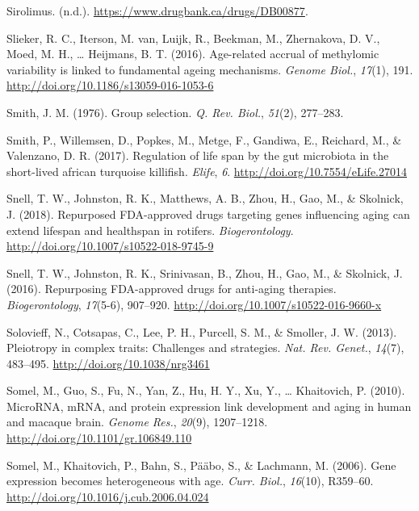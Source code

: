 \documentclass[12pt,twoside]{unicam}
\begin{document}
\begin{cslreferences}
\leavevmode\hypertarget{ref-Sirolimus}{}%
Sirolimus. (n.d.). \url{https://www.drugbank.ca/drugs/DB00877}.

\leavevmode\hypertarget{ref-Slieker2016}{}%
Slieker, R. C., Iterson, M. van, Luijk, R., Beekman, M., Zhernakova, D. V., Moed, M. H., \ldots{} Heijmans, B. T. (2016). Age-related accrual of methylomic variability is linked to fundamental ageing mechanisms. \emph{Genome Biol.}, \emph{17}(1), 191. \url{http://doi.org/10.1186/s13059-016-1053-6}

\leavevmode\hypertarget{ref-Smith1976}{}%
Smith, J. M. (1976). Group selection. \emph{Q. Rev. Biol.}, \emph{51}(2), 277--283.

\leavevmode\hypertarget{ref-Smith2017}{}%
Smith, P., Willemsen, D., Popkes, M., Metge, F., Gandiwa, E., Reichard, M., \& Valenzano, D. R. (2017). Regulation of life span by the gut microbiota in the short-lived african turquoise killifish. \emph{Elife}, \emph{6}. \url{http://doi.org/10.7554/eLife.27014}

\leavevmode\hypertarget{ref-Snell2018}{}%
Snell, T. W., Johnston, R. K., Matthews, A. B., Zhou, H., Gao, M., \& Skolnick, J. (2018). Repurposed FDA-approved drugs targeting genes influencing aging can extend lifespan and healthspan in rotifers. \emph{Biogerontology}. \url{http://doi.org/10.1007/s10522-018-9745-9}

\leavevmode\hypertarget{ref-Snell2016}{}%
Snell, T. W., Johnston, R. K., Srinivasan, B., Zhou, H., Gao, M., \& Skolnick, J. (2016). Repurposing FDA-approved drugs for anti-aging therapies. \emph{Biogerontology}, \emph{17}(5-6), 907--920. \url{http://doi.org/10.1007/s10522-016-9660-x}

\leavevmode\hypertarget{ref-Solovieff2013}{}%
Solovieff, N., Cotsapas, C., Lee, P. H., Purcell, S. M., \& Smoller, J. W. (2013). Pleiotropy in complex traits: Challenges and strategies. \emph{Nat. Rev. Genet.}, \emph{14}(7), 483--495. \url{http://doi.org/10.1038/nrg3461}

\leavevmode\hypertarget{ref-Somel2010}{}%
Somel, M., Guo, S., Fu, N., Yan, Z., Hu, H. Y., Xu, Y., \ldots{} Khaitovich, P. (2010). MicroRNA, mRNA, and protein expression link development and aging in human and macaque brain. \emph{Genome Res.}, \emph{20}(9), 1207--1218. \url{http://doi.org/10.1101/gr.106849.110}

\leavevmode\hypertarget{ref-Somel2006}{}%
Somel, M., Khaitovich, P., Bahn, S., Pääbo, S., \& Lachmann, M. (2006). Gene expression becomes heterogeneous with age. \emph{Curr. Biol.}, \emph{16}(10), R359--60. \url{http://doi.org/10.1016/j.cub.2006.04.024}


\end{cslreferences}
\end{document}
